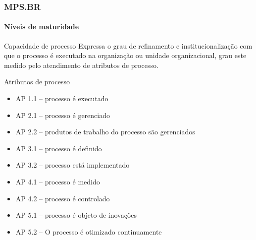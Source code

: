 \begin{frame}
	\frametitle{MPS.BR}
	\framesubtitle{Níveis de maturidade}
	
	\begin{block:concept}{Capacidade de processo}
		Expressa o grau de refinamento e institucionalização com que o processo é
		executado na organização ou unidade organizacional, grau este medido pelo
		atendimento de atributos de processo.
	\end{block:concept}

	\begin{block:fact}{Atributos de processo}
		\begin{itemize}
			\item AP 1.1 -- processo é executado
			\item AP 2.1 -- processo é gerenciado
			\item AP 2.2 -- produtos de trabalho do processo são gerenciados
			\item AP 3.1 -- processo é definido
			\item AP 3.2 -- processo está implementado
			\item AP 4.1 -- processo é medido
			\item AP 4.2 -- processo é controlado
			\item AP 5.1 -- processo é objeto de inovações
			\item AP 5.2 -- O processo é otimizado continuamente
		\end{itemize}
	\end{block:fact}
	
\end{frame}


